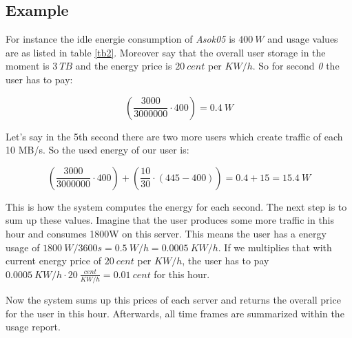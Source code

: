   \subsection{Example}
    For instance the idle energie consumption of \textit{Asok05} is $400\ W$ and usage values are as listed in table \ref{tb2}. Moreover say that the overall user storage in the moment is $3\ TB$ and the energy price is $20\ cent$ per $KW/h$. So for second \textit{0} the user has to pay:
    
     $$(\frac{3000}{3000000} \cdot 400) = 0.4\ W $$
    
    Let's say in the 5th second there are two more users which create traffic of each 10 MB/s. So the used energy of our user is:
    
     $$(\frac{3000}{3000000} \cdot 400) + (\frac{10}{30} \cdot (445 - 400)) = 0.4 + 15 = 15.4\ W $$
           
  	This is how the system computes the energy for each second. The next step is to sum up these values. Imagine that the user produces some more traffic in this hour and consumes 1800W on this server. This means the user has a energy usage of $1800\ W / 3600s = 0.5\ W/h = 0.0005 \ KW/h$. If we multiplies that with current energy price of $20\ cent$ per $KW/h$, the user has to pay $ 0.0005\ KW/h \cdot 20\ \frac{cent}{KW/h} = 0.01\ cent$ for this hour.
  	
  	Now the system sums up this prices of each server and returns the overall price for the user in this hour. Afterwards, all time frames are summarized within the usage report.
